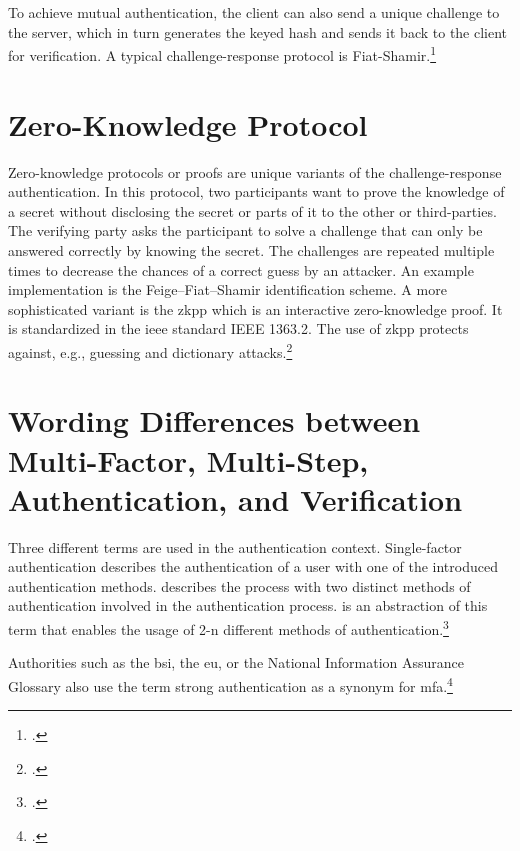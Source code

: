 To achieve mutual authentication, the client can also send a unique challenge to the server, which in turn generates the keyed hash and sends it back to the client for verification. A typical challenge-response protocol is Fiat-Shamir.\footcites[See][Chapter 13.6]{waschke2017personal}[See][489--491]{eckert-it-sec-9}

\section{Zero-Knowledge Protocol}

Zero-knowledge protocols or proofs are unique variants of the challenge-response authentication. In this protocol, two participants want to prove the knowledge of a secret without disclosing the secret or parts of it to the other or third-parties. The verifying party asks the participant to solve a challenge that can only be answered correctly by knowing the secret. The challenges are repeated multiple times to decrease the chances of a correct guess by an attacker. An example implementation is the Feige–Fiat–Shamir identification scheme. A more sophisticated variant is the \gls{zkpp} which is an interactive zero-knowledge proof. It is standardized in the \gls{ieee} standard IEEE 1363.2. The use of \gls{zkpp} protects against, e.g., guessing and dictionary attacks.\footcites[See][492]{eckert-it-sec-9}[See][Chapter 28.3.7]{1174011}[See][769--770]{FISCHERHBNER2017759}[See][]{Feige1988}

\section{Wording Differences between Multi-Factor, Multi-Step, Authentication, and Verification}

Three different terms are used in the authentication context. Single-factor authentication describes the authentication of a user with one of the introduced authentication methods.  describes the process with two distinct methods of authentication involved in the authentication process.  is an abstraction of this term that enables the usage of 2-n different methods of authentication.\footcites[See][186--188]{dasgupta2017multi}

Authorities such as the \gls{bsi}, the \gls{eu}, or the National Information Assurance Glossary also use the term \frqq strong authentication\flqq{} as a synonym for \gls{mfa}.\footcites[See][117]{CNSS4009}[See][11]{deutschland2018grundschutz}

